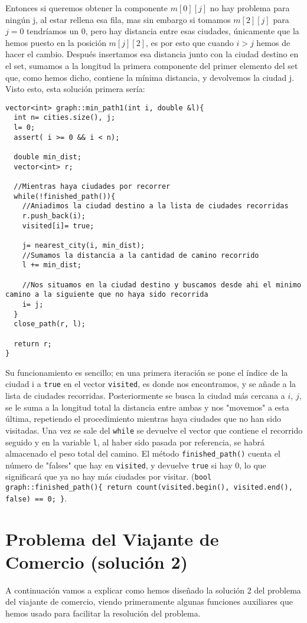 \documentclass[11pt]{article}
\begin{document}
Entonces si queremos obtener la componente $m[0][j]$ no hay problema para ningún j, al estar rellena esa fila, mas sin embargo si tomamos $m[2][j]$ para $j= 0$ tendríamos un 0, pero hay distancia entre esas ciudades, únicamente que la hemos puesto en la posición $m[j][2]$, es por esto que cuando $i>j$ hemos de hacer el cambio. Después insertamos esa distancia junto con la ciudad destino en el set, sumamos a la longitud la primera componente del primer elemento del set que, como hemos dicho, contiene la mínima distancia, y devolvemos la ciudad j. Visto esto, esta solución primera sería:

\begin{lstlisting}
vector<int> graph::min_path1(int i, double &l){
  int n= cities.size(), j;
  l= 0;
  assert( i >= 0 && i < n);

  double min_dist;
  vector<int> r;

  //Mientras haya ciudades por recorrer
  while(!finished_path()){
    //Aniadimos la ciudad destino a la lista de ciudades recorridas
    r.push_back(i);
    visited[i]= true;

    j= nearest_city(i, min_dist);
    //Sumamos la distancia a la cantidad de camino recorrido
    l += min_dist;

    //Nos situamos en la ciudad destino y buscamos desde ahi el minimo camino a la siguiente que no haya sido recorrida
    i= j;
  }
  close_path(r, l);

  return r;
}
\end{lstlisting} 
Su funcionamiento es sencillo; en una primera iteración se pone el índice de la ciudad i a \verb|true| en el vector \verb|visited|, es donde nos encontramos, y se añade a la lista de ciudades recorridas. Posteriormente se busca la ciudad más cercana a $i$, $j$, se le suma a la longitud total la distancia entre ambas y nos "movemos" a esta última, repetiendo el procedimiento mientras haya ciudades que no han sido visitadas. Una vez se sale del \verb|while| se devuelve el vector que contiene el recorrido seguido y en la variable \verb|l|, al haber sido pasada por referencia, se habrá almacenado el peso total del camino. El método \verb|finished_path()| cuenta el número de "falses" que hay en \verb|visited|, y devuelve \verb|true| si hay 0, lo que significará que ya no hay más ciudades por visitar. (\verb|bool graph::finished_path(){ return count(visited.begin(), visited.end(), false) == 0; }|.

\section{Problema del Viajante de Comercio (solución 2)}
A continuación vamos a explicar como hemos diseñado la solución 2 del problema del viajante de comercio, viendo primeramente algunas funciones auxiliares que hemos usado para facilitar la resolución del problema.
\end{document}
